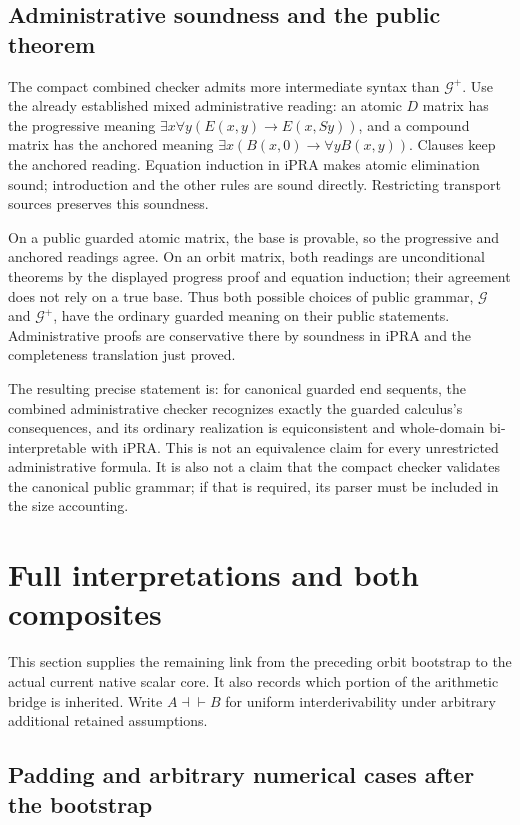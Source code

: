\documentclass[11pt,letterpaper]{article}
\theoremstyle{definition}\newtheorem{definition}[theorem]{Definition}
\theoremstyle{remark}\newtheorem{remark}[theorem]{Remark}
\newcommand{\equider}{\mathrel{\dashv\vdash}}
\begin{document}
\subsection{Administrative soundness and the public theorem}

The compact combined checker admits more intermediate syntax than
$\mathcal G^+$. Use the already established mixed administrative reading:
an atomic $D$ matrix has the progressive meaning
$\exists x\forall y(E(x,y)\to E(x,Sy))$, and a compound matrix has the
anchored meaning $\exists x(B(x,0)\to\forall yB(x,y))$.
Clauses keep the anchored reading. Equation induction in iPRA makes
atomic elimination sound; introduction and the other rules are sound
directly. Restricting transport sources preserves this soundness.

On a public guarded atomic matrix, the base is provable, so the
progressive and anchored readings agree. On an orbit matrix, both
readings are unconditional theorems by the displayed progress proof
and equation induction; their agreement does not rely on a true base.
Thus both possible choices of public grammar, $\mathcal G$ and
$\mathcal G^+$, have the ordinary guarded meaning on their public
statements. Administrative proofs are conservative there by soundness
in iPRA and the completeness translation just proved.

The resulting precise statement is: for canonical guarded end sequents,
the combined administrative checker recognizes exactly the guarded
calculus's consequences, and its ordinary realization is equiconsistent
and whole-domain bi-interpretable with iPRA. This is not an equivalence
claim for every unrestricted administrative formula. It is also not
a claim that the compact checker validates the canonical public grammar;
if that is required, its parser must be included in the size accounting.
\section{Full interpretations and both composites}\label{sec:equivalence}

This section supplies the remaining link from the preceding orbit bootstrap
to the actual current native scalar core. It also records which portion of
the arithmetic bridge is inherited. Write $A\equider B$ for uniform
interderivability under arbitrary additional retained assumptions.

\subsection{Padding and arbitrary numerical cases after the bootstrap}
\end{document}
